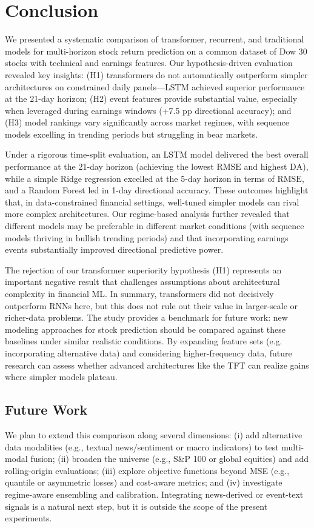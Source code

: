 \documentclass[10pt,twocolumn]{article}
\newcommand{\rmse}{\ensuremath{\mathrm{RMSE}}}
\newcommand{\da}{\ensuremath{\mathrm{DA}}}
\begin{document}
\section{Conclusion}
We presented a systematic comparison of transformer, recurrent, and traditional models for multi-horizon stock return prediction on a common dataset of Dow 30 stocks with technical and earnings features. Our hypothesis-driven evaluation revealed key insights: (H1) transformers do not automatically outperform simpler architectures on constrained daily panels---LSTM achieved superior performance at the 21-day horizon; (H2) event features provide substantial value, especially when leveraged during earnings windows (+7.5 pp directional accuracy); and (H3) model rankings vary significantly across market regimes, with sequence models excelling in trending periods but struggling in bear markets.

Under a rigorous time-split evaluation, an LSTM model delivered the best overall performance at the 21-day horizon (achieving the lowest \rmse{} and highest \da{}), while a simple Ridge regression excelled at the 5-day horizon in terms of \rmse{}, and a Random Forest led in 1-day directional accuracy. These outcomes highlight that, in data-constrained financial settings, well-tuned simpler models can rival more complex architectures. Our regime-based analysis further revealed that different models may be preferable in different market conditions (with sequence models thriving in bullish trending periods) and that incorporating earnings events substantially improved directional predictive power. 

The rejection of our transformer superiority hypothesis (H1) represents an important negative result that challenges assumptions about architectural complexity in financial ML. In summary, transformers did not decisively outperform RNNs here, but this does not rule out their value in larger-scale or richer-data problems. The study provides a benchmark for future work: new modeling approaches for stock prediction should be compared against these baselines under similar realistic conditions. By expanding feature sets (e.g. incorporating alternative data) and considering higher-frequency data, future research can assess whether advanced architectures like the TFT can realize gains where simpler models plateau.
\subsection*{Future Work}
We plan to extend this comparison along several dimensions: (i) add alternative data modalities (e.g., textual news/sentiment or macro indicators) to test multi-modal fusion; (ii) broaden the universe (e.g., S\&P 100 or global equities) and add rolling-origin evaluations; (iii) explore objective functions beyond MSE (e.g., quantile or asymmetric losses) and cost-aware metrics; and (iv) investigate regime-aware ensembling and calibration. Integrating news-derived or event-text signals is a natural next step, but it is outside the scope of the present experiments.
\end{document}
